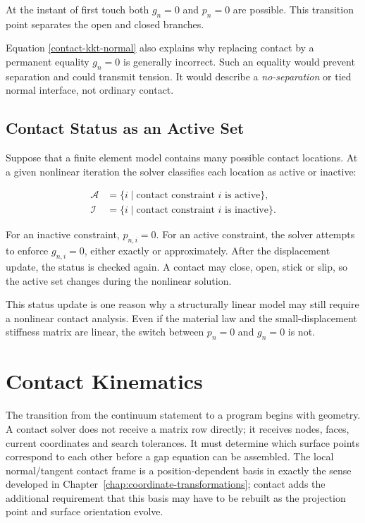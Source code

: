 At the instant of first touch both $ g_n = 0 $ and $ p_n = 0 $ are possible.
This transition point separates the open and closed branches.

Equation \eqref{contact-kkt-normal} also explains why replacing contact by a
permanent equality $ g_n = 0 $ is generally incorrect. Such an equality would
prevent separation and could transmit tension. It would describe a
\textit{no-separation} or tied normal interface, not ordinary contact.

\subsection{Contact Status as an Active Set}

Suppose that a finite element model contains many possible contact locations.
At a given nonlinear iteration the solver classifies each location as active or
inactive:

\begin{equation}
    \begin{aligned}
        \mathcal{A} &= \{ i \; | \; \text{contact constraint } i
        \text{ is active} \}, \\
        \mathcal{I} &= \{ i \; | \; \text{contact constraint } i
        \text{ is inactive} \}.
    \end{aligned}
\end{equation}

For an inactive constraint, $ p_{n,i} = 0 $. For an active constraint, the
solver attempts to enforce $ g_{n,i} = 0 $, either exactly or approximately.
After the displacement update, the status is checked again. A contact may close,
open, stick or slip, so the active set changes during the nonlinear solution.

This status update is one reason why a structurally linear model may still
require a nonlinear contact analysis. Even if the material law and the
small-displacement stiffness matrix are linear, the switch between
$ p_n = 0 $ and $ g_n = 0 $ is not.

\section{Contact Kinematics}

The transition from the continuum statement to a program begins with geometry.
A contact solver does not receive a matrix row directly; it receives nodes,
faces, current coordinates and search tolerances. It must determine which
surface points correspond to each other before a gap equation can be assembled.
The local normal/tangent contact frame is a position-dependent basis in exactly
the sense developed in Chapter~\ref{chap:coordinate-transformations}; contact
adds the additional requirement that this basis may have to be rebuilt as the
projection point and surface orientation evolve.

